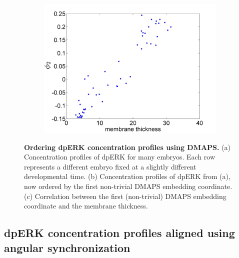 \documentclass[10pt]{article}
\begin{document}
\begin{figure}[H]
\begin{subfigure}{0.3\textwidth}
\includegraphics[width=\textwidth]{DMAPS_time_corr}
\caption{}
\end{subfigure}
\caption{{\bf Ordering dpERK concentration profiles using DMAPS.} (a) Concentration profiles of dpERK for many embryos. Each row represents a different embryo fixed at a slightly different developmental time.
(b) Concentration profiles of dpERK from (a), now ordered by the first non-trivial DMAPS embedding coordinate.
(c) Correlation between the first (non-trivial) DMAPS embedding coordinate and the membrane thickness.}
\label{fig:DMAPS_ordering}
\end{figure}

\subsection*{dpERK concentration profiles aligned using angular synchronization}
\end{document}
